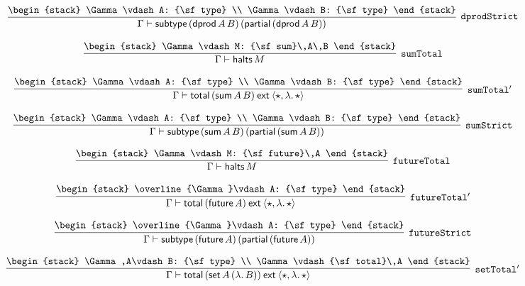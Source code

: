 \[
\infer[{\tt dprodStrict}]{\Gamma \vdash {\sf subtype}\,({\sf dprod}\,A\,B)\,({\sf partial}\,({\sf dprod}\,A\,B))}{
\begin{stack}
\Gamma \vdash A: {\sf type}
\\
\Gamma \vdash B: {\sf type}
\end{stack}}
\]

\[
\infer[{\tt sumTotal}]{\Gamma \vdash {\sf halts}\,M}{
\begin{stack}
\Gamma \vdash M: {\sf sum}\,A\,B
\end{stack}}
\]

\[
\infer[{\tt sumTotal'}]{\Gamma \vdash {\sf total}\,({\sf sum}\,A\,B)\:{\sf ext}\:\langle \star ,\lambda .\,\star \rangle }{
\begin{stack}
\Gamma \vdash A: {\sf type}
\\
\Gamma \vdash B: {\sf type}
\end{stack}}
\]

\[
\infer[{\tt sumStrict}]{\Gamma \vdash {\sf subtype}\,({\sf sum}\,A\,B)\,({\sf partial}\,({\sf sum}\,A\,B))}{
\begin{stack}
\Gamma \vdash A: {\sf type}
\\
\Gamma \vdash B: {\sf type}
\end{stack}}
\]

\[
\infer[{\tt futureTotal}]{\Gamma \vdash {\sf halts}\,M}{
\begin{stack}
\Gamma \vdash M: {\sf future}\,A
\end{stack}}
\]

\[
\infer[{\tt futureTotal'}]{\Gamma \vdash {\sf total}\,({\sf future}\,A)\:{\sf ext}\:\langle \star ,\lambda .\,\star \rangle }{
\begin{stack}
\overline{\Gamma}\vdash A: {\sf type}
\end{stack}}
\]

\[
\infer[{\tt futureStrict}]{\Gamma \vdash {\sf subtype}\,({\sf future}\,A)\,({\sf partial}\,({\sf future}\,A))}{
\begin{stack}
\overline{\Gamma}\vdash A: {\sf type}
\end{stack}}
\]

\[
\infer[{\tt setTotal'}]{\Gamma \vdash {\sf total}\,({\sf set}\,A\,(\lambda .\,B))\:{\sf ext}\:\langle \star ,\lambda .\,\star \rangle }{
\begin{stack}
\Gamma ,A\vdash B: {\sf type}
\\
\Gamma \vdash {\sf total}\,A
\end{stack}}
\]

